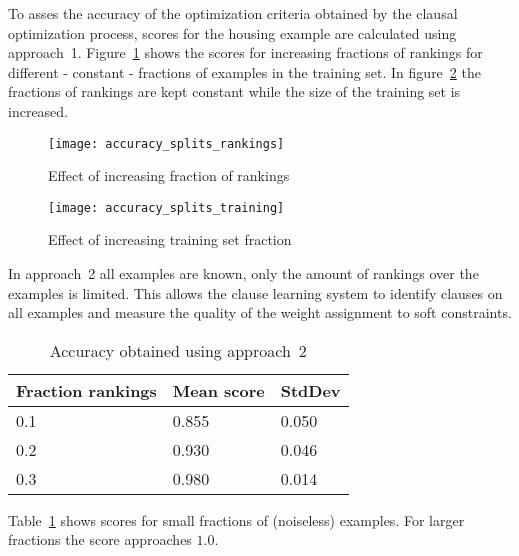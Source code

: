 \begin{experiment}

	To asses the accuracy of the optimization criteria obtained by the clausal optimization process, scores for the housing example are calculated using approach~1.
	Figure~\ref{fig:accuracy_splits_rankings} shows the scores for increasing fractions of rankings for different - constant - fractions of examples in the training set.
	In figure~\ref{fig:accuracy_splits_training} the fractions of rankings are kept constant while the size of the training set is increased.

	\begin{figure}

		\caption{Effect of increasing fraction of rankings}
		\centering
			\texttt{[image: accuracy\_splits\_rankings]}
		\label{fig:accuracy_splits_rankings}

	\end{figure}

	\begin{figure}

		\caption{Effect of increasing training set fraction}
		\centering
			\texttt{[image: accuracy\_splits\_training]}
		\label{fig:accuracy_splits_training}

	\end{figure}

\end{experiment}

\begin{experiment}
\label{exp:exp_acc_approach2}
		In approach~2 all examples are known, only the amount of rankings over the examples is limited.
		This allows the clause learning system to identify clauses on all examples and measure the quality of the weight assignment to soft constraints.

		\begin{table}[!htp]
		\begin{tabularx}{\textwidth}{XXX}
			\textbf{Fraction rankings}	& \textbf{Mean score}	& \textbf{StdDev} \\
			\toprule
			0.1 	& 0.855		& 0.050 \\
			0.2 	& 0.930		& 0.046 \\
			0.3 	& 0.980 	& 0.014 \\
		\end{tabularx}
		\label{tbl:exp_acc_approach2}
		\caption{Accuracy obtained using approach~2}

		Table~\ref{tbl:exp_acc_approach2} shows scores for small fractions of (noiseless) examples.
		For larger fractions the score approaches $1.0$.
	\end{table}

\end{experiment}

